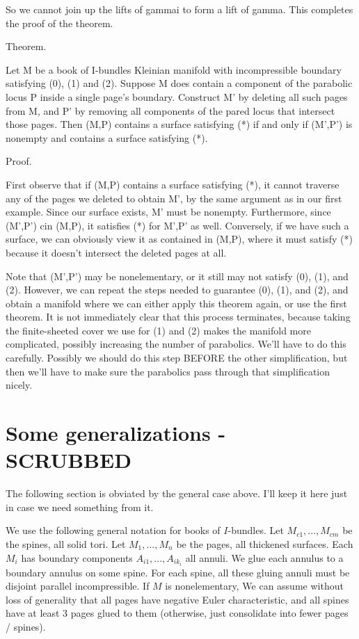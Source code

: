 \documentclass[12pt]{amsart}
\theoremstyle{definition}
\theoremstyle{remark}
\begin{document}
So we cannot join up the lifts of gammai to form a lift of gamma. This
completes the proof of the theorem.


Theorem.

Let M be a book of I-bundles Kleinian manifold with incompressible boundary
satisfying (0), (1) and (2). Suppose M does contain a component of the
parabolic locus P inside a single page's boundary. Construct M' by deleting all
such pages from M, and P' by removing all components of the pared locus that
intersect those pages. Then (M,P) contains a surface satisfying (*) if and only
if (M',P') is nonempty and contains a surface satisfying (*).

Proof.

First observe that if (M,P) contains a surface satisfying (*), it cannot
traverse any of the pages we deleted to obtain M', by the same argument as in
our first example.  Since our surface exists, M' must be nonempty.
Furthermore, since (M',P') cin (M,P), it satisfies (*) for M',P' as well.
Conversely, if we have such a surface, we can obviously view it as contained in
(M,P), where it must satisfy (*) because it doesn't intersect the deleted pages
at all.

Note that (M',P') may be nonelementary, or it still may not satisfy (0), (1),
and (2).  However, we can repeat the steps needed to guarantee (0), (1), and
(2), and obtain a manifold where we can either apply this theorem again, or use
the first theorem. It is not immediately clear that this process terminates,
because taking the finite-sheeted cover we use for (1) and (2) makes the
manifold more complicated, possibly increasing the number of parabolics. We'll
have to do this carefully. Possibly we should do this step BEFORE the other
simplification, but then we'll have to make sure the parabolics pass through
that simplification nicely.

\section{Some generalizations - SCRUBBED}

The following section is obviated by the general case above. I'll keep it here
just in case we need something from it.

We use the following general notation for books of $I$-bundles. Let
$M_{c1},...,M_{cm}$ be the spines, all solid tori. Let $M_1,...,M_n$ be the
pages, all thickened surfaces. Each $M_i$ has boundary components
$A_{i1},...,A_{ik_i}$ all annuli. We glue each annulus to a boundary annulus on
some spine. For each spine, all these gluing annuli must be disjoint parallel
incompressible. If $M$ is nonelementary, We can assume without loss of
generality that all pages have negative Euler characteristic, and all spines
have at least 3 pages glued to them (otherwise, just consolidate into fewer
pages / spines).
\end{document}
